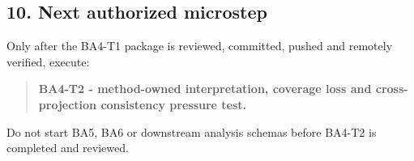 \documentclass[11pt,a4paper]{article}
\begin{document}
\subsection{10. Next authorized microstep}\label{10-next-authorized-microstep}

Only after the BA4-T1 package is reviewed, committed, pushed and remotely verified, execute:

\begin{quote}
\textbf{BA4-T2 - method-owned interpretation, coverage loss and cross-projection consistency pressure test.}
\end{quote}

Do not start BA5, BA6 or downstream analysis schemas before BA4-T2 is completed and reviewed.
\end{document}

